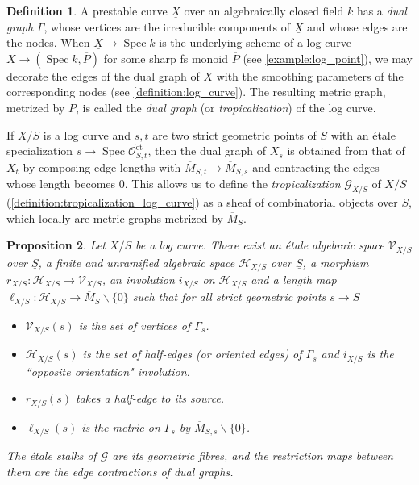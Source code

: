\documentclass[a4paper,11pt]{amsart} %
\numberwithin{equation}{subsection}
\newcommand{\ca}[1]{{\mathcal{#1}}}
\newcommand{\ul}[1]{{\underline{#1}}}
\def\et{\mathrm{\acute{e}t}}
\def\o#1{\overline{#1}}
\newcommand{\Spec}{\operatorname{Spec}}
\theoremstyle{definition}
\newtheorem{definition}{Definition}[section]
\theoremstyle{plain}%
\newtheorem{proposition}[definition]{Proposition}
\theoremstyle{remark}
\begin{document}
    

\begin{definition}\label{dualgr}
    A prestable curve $\ul X$ over an algebraically closed field $k$ has a \emph{dual graph} $\Gamma$, whose vertices are the irreducible components of $\ul X$ and whose edges are the nodes. When $\ul X \to \Spec k$ is the underlying scheme of a log curve $X \to (\Spec k,\o P)$ for some sharp fs monoid $\o P$ (see \ref{example:log_point}), we may decorate the edges of the dual graph of $\ul X$ with the smoothing parameters of the corresponding nodes (see \ref{definition:log_curve}). The resulting metric graph, metrized by $\o P$, is called the \emph{dual graph} (or \emph{tropicalization}) of the log curve.
\end{definition}

If $X/S$ is a log curve and $s,t$ are two strict geometric points of $S$ with an \'etale specialization $s \to \Spec \ca O_{S,t}^{\et}$, then the dual graph of $X_s$ is obtained from that of $X_t$ by composing edge lengths with $\o M_{S,t} \to \o M_{S,s}$ and contracting the edges whose length becomes $0$. This allows us to define the \emph{tropicalization} $\ca G_{X/S}$ of $X/S$ (\ref{definition:tropicalization_log_curve}) as a sheaf of combinatorial objects over $S$, which locally are metric graphs metrized by $\o M_S$.

\begin{proposition}\label{proposition:tropicalizing_log_curves}
    Let $X/S$ be a log curve. There exist an \'etale algebraic space $\ca V_{X/S}$ over $\ul S$, a finite and unramified algebraic space $\ca H_{X/S}$ over $\ul S$, a morphism $r_{X/S} \colon \ca H_{X/S} \to \ca V_{X/S}$, an involution $i_{X/S}$ on $\ca H_{X/S}$ and a length map $\ell_{X/S} \colon \ca H_{X/S} \to \o M_S\backslash\{0\}$ such that for all strict geometric points $s \to S$
    \begin{itemize}
        \item $\ca V_{X/S}(s)$ is the set of vertices of $\Gamma_s$.
        \item $\ca H_{X/S}(s)$ is the set of half-edges (or oriented edges) of $\Gamma_s$ and $i_{X/S}$ is the ``opposite orientation" involution.
        \item $r_{X/S}(s)$ takes a half-edge to its source.
        \item $\ell_{X/S}(s)$ is the metric on $\Gamma_s$ by $\o M_{S,s}\backslash\{0\}$.
    \end{itemize}
    The \'etale stalks of $\ca G$ are its geometric fibres, and the restriction maps between them are the edge contractions of dual graphs.
\end{proposition}
\end{document}
